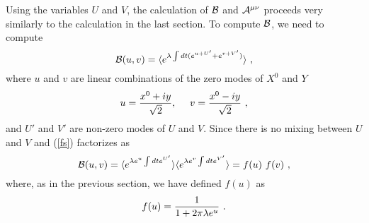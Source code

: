 \documentclass[a4paper,12pt]{article}
\begin{document}
Using the variables $U$ and $V$, 
the calculation of ${\cal B}$ and ${\cal A}^{\mu \nu}$ proceeds very similarly to the calculation in the last section. 
To compute ${\cal B}$, we need to compute 
\begin{equation}
{\cal B}(u,v)= \langle e^{\lambda \int dt (e^{u+U'}+e^{v+V'})}\rangle~, 
\label{fs}
\end{equation}
where $u$ and $v$ are linear combinations of the zero modes of $X^0$ and $Y$
\begin{equation}
u={x^0+iy \over \sqrt{2}}, ~~~~v={x^0 -iy \over \sqrt{2}}~,
\end{equation}
and $U'$ and $V'$ are non-zero modes of $U$ and $V$. Since there is no mixing between 
$U$ and $V$ and  (\ref{fs})  factorizes  as
\begin{equation}
{\cal B}(u,v)= \langle e^{\lambda e^{u} \int dt e^{U'}}\rangle  \langle e^{\lambda e^{v} \int dt e^{V'}}\rangle =f(u)~f(v)~,
\end{equation}
where, as in the previous section, we have  defined $f(u)$ as
\begin{equation}
f(u)={1 \over {1+2 \pi \lambda e^{u}}}~.
\end{equation}
\end{document}
